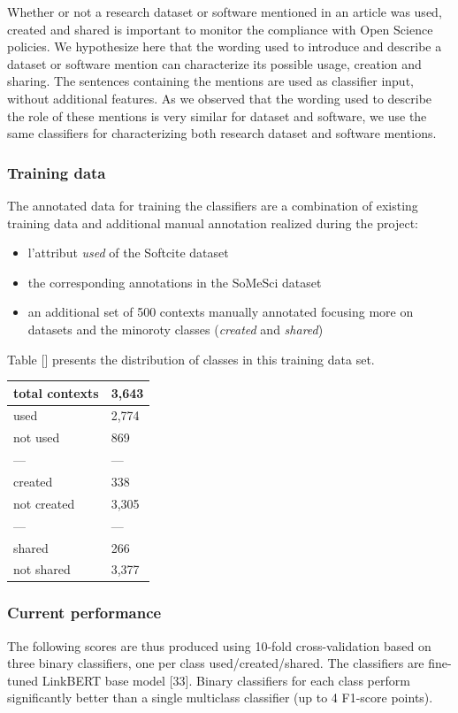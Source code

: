 \documentclass[
]{article}
\begin{document}
Whether or not a research dataset or software mentioned in an article
was used, created and shared is important to monitor the compliance with
Open Science policies. We hypothesize here that the wording used to
introduce and describe a dataset or software mention can characterize
its possible usage, creation and sharing. The sentences containing the
mentions are used as classifier input, without additional features. As
we observed that the wording used to describe the role of these mentions
is very similar for dataset and software, we use the same classifiers
for characterizing both research dataset and software mentions.

\hypertarget{training-data}{%
\subsubsection{Training data}\label{training-data}}

The annotated data for training the classifiers are a combination of
existing training data and additional manual annotation realized during
the project:

\begin{itemize}
\item
  l'attribut \emph{used} of the Softcite dataset
\item
  the corresponding annotations in the SoMeSci dataset
\item
  an additional set of 500 contexts manually annotated focusing more on
  datasets and the minoroty classes (\emph{created} and \emph{shared})
\end{itemize}

Table {[}{]} presents the distribution of classes in this training data
set.

\begin{longtable}[]{@{}ll@{}}
\toprule
total contexts & 3,643\tabularnewline
\midrule
\endhead
used & 2,774\tabularnewline
not used & 869\tabularnewline
--- & ---\tabularnewline
created & 338\tabularnewline
not created & 3,305\tabularnewline
--- & ---\tabularnewline
shared & 266\tabularnewline
not shared & 3,377\tabularnewline
\bottomrule
\end{longtable}

\hypertarget{current-performance-1}{%
\subsubsection{Current performance}\label{current-performance-1}}

The following scores are thus produced using 10-fold cross-validation
based on three binary classifiers, one per class used/created/shared.
The classifiers are fine-tuned LinkBERT base model {[}33{]}. Binary
classifiers for each class perform significantly better than a single
multiclass classifier (up to 4 F1-score points).
\end{document}
